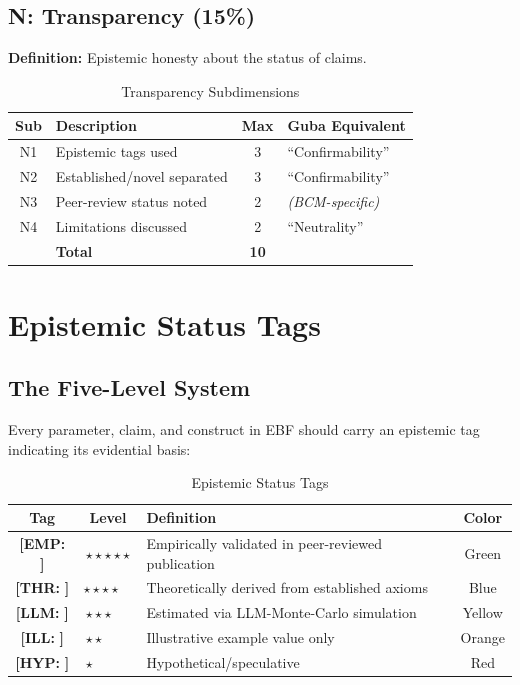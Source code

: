 \documentclass[11pt,a4paper]{article}
\newcommand{\tagEMP}[1]{\textcolor{empgreen}{\textbf{[EMP:} #1\textbf{]}}}
\newcommand{\tagTHR}[1]{\textcolor{thrblue}{\textbf{[THR:} #1\textbf{]}}}
\newcommand{\tagLLM}[1]{\textcolor{llmyellow}{\textbf{[LLM:} #1\textbf{]}}}
\newcommand{\tagILL}[1]{\textcolor{illorange}{\textbf{[ILL:} #1\textbf{]}}}
\newcommand{\tagHYP}[1]{\textcolor{hypred}{\textbf{[HYP:} #1\textbf{]}}}
\begin{document}
\subsection{N: Transparency (15\%)}

\textbf{Definition:} Epistemic honesty about the status of claims.

\begin{table}[h]
\centering
\caption{Transparency Subdimensions}
\begin{tabular}{clcp{6cm}}
\toprule
\textbf{Sub} & \textbf{Description} & \textbf{Max} & \textbf{Guba Equivalent} \\
\midrule
N1 & Epistemic tags used & 3 & ``Confirmability'' \\
N2 & Established/novel separated & 3 & ``Confirmability'' \\
N3 & Peer-review status noted & 2 & \textit{(BCM-specific)} \\
N4 & Limitations discussed & 2 & ``Neutrality'' \\
\midrule
& \textbf{Total} & \textbf{10} & \\
\bottomrule
\end{tabular}
\end{table}


\section{Epistemic Status Tags}
\label{sec:tags}

\subsection{The Five-Level System}

Every parameter, claim, and construct in EBF should carry an epistemic tag indicating its evidential basis:

\begin{table}[h]
\centering
\caption{Epistemic Status Tags}
\label{tab:tags}
\begin{tabular}{ccp{7cm}c}
\toprule
\textbf{Tag} & \textbf{Level} & \textbf{Definition} & \textbf{Color} \\
\midrule
\tagEMP{} & $\star\star\star\star\star$ & Empirically validated in peer-reviewed publication & Green \\
\tagTHR{} & $\star\star\star\star\phantom{\star}$ & Theoretically derived from established axioms & Blue \\
\tagLLM{} & $\star\star\star\phantom{\star\star}$ & Estimated via LLM-Monte-Carlo simulation & Yellow \\
\tagILL{} & $\star\star\phantom{\star\star\star}$ & Illustrative example value only & Orange \\
\tagHYP{} & $\star\phantom{\star\star\star\star}$ & Hypothetical/speculative & Red \\
\bottomrule
\end{tabular}
\end{table}
\end{document}
